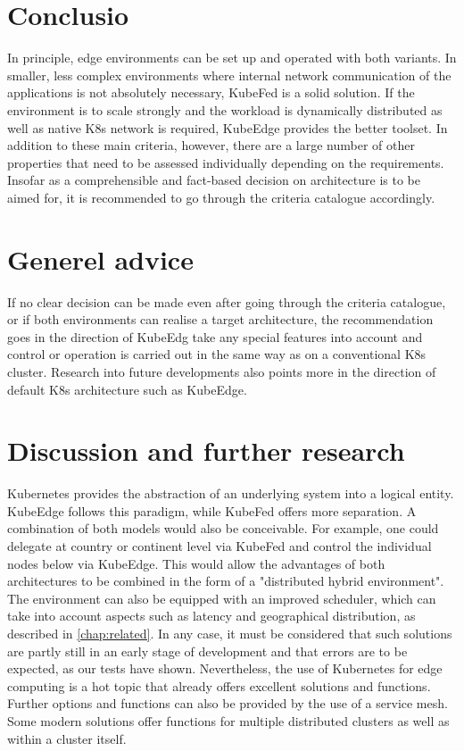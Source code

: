 \documentclass[MSC,Master,english]{twbook}%
\begin{document}
\section{Conclusio}
\label{sec:conclusio}
In principle, edge environments can be set up and operated with both variants. In smaller, less complex environments where internal network communication of the applications is not absolutely necessary, KubeFed is a solid solution. If the environment is to scale strongly and the workload is dynamically distributed as well as native \ac{K8s} network is required, KubeEdge provides the better toolset. In addition to these main criteria, however, there are a large number of other properties that need to be assessed individually depending on the requirements. Insofar as a comprehensible and fact-based decision on architecture is to be aimed for, it is recommended to go through the criteria catalogue accordingly.

\section{Generel advice}
If no clear decision can be made even after going through the criteria catalogue, or if both environments can realise a target architecture, the recommendation goes in the direction of KubeEdg take any special features into account and control or operation is carried out in the same way as on a conventional \ac{K8s} cluster. Research into future developments also points more in the direction of default K8s architecture such as KubeEdge.

\section{Discussion and further research}
\label{sec:discuss}
Kubernetes provides the abstraction of an underlying system into a logical entity. KubeEdge follows this paradigm, while KubeFed offers more separation. A combination of both models would also be conceivable. For example, one could delegate at country or continent level via KubeFed and control the individual nodes below via KubeEdge. This would allow the advantages of both architectures to be combined in the form of a "distributed hybrid environment". The environment can also be equipped with an improved scheduler, which can take into account aspects such as latency and geographical distribution, as described in \autoref{chap:related}. In any case, it must be considered that such solutions are partly still in an early stage of development and that errors are to be expected, as our tests have shown. Nevertheless, the use of Kubernetes for edge computing is a hot topic that already offers excellent solutions and functions. Further options and functions can also be provided by the use of a service mesh. Some modern solutions offer functions for multiple distributed clusters as well as within a cluster itself.
\end{document}
